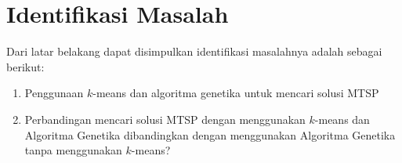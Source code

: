 \section{Identifikasi Masalah}

Dari latar belakang dapat disimpulkan identifikasi masalahnya adalah sebagai berikut:
\begin{enumerate}
	\item Penggunaan $k$-means dan algoritma genetika untuk mencari solusi MTSP
	\item Perbandingan mencari solusi MTSP dengan menggunakan $k$-means dan Algoritma Genetika dibandingkan dengan menggunakan Algoritma Genetika tanpa menggunakan $k$-means?
\end{enumerate}